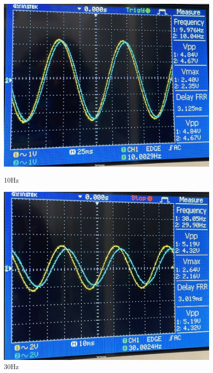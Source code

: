 \begin{figure}[h]
    \centering
    \begin{minipage}{.33\textwidth}
        \includegraphics[width=1\linewidth]{assets/exp2_10.jpeg}
        \caption{10Hz}
        \label{fig:exp2_10}
    \end{minipage}%
    \begin{minipage}{.33\textwidth}
        \includegraphics[width=1\linewidth]{assets/exp2_30.jpeg}
        \caption{30Hz}
        \label{fig:exp2_30}
    \end{minipage}%
    \begin{minipage}{.33\textwidth}

\end{minipage}
\end{figure}
